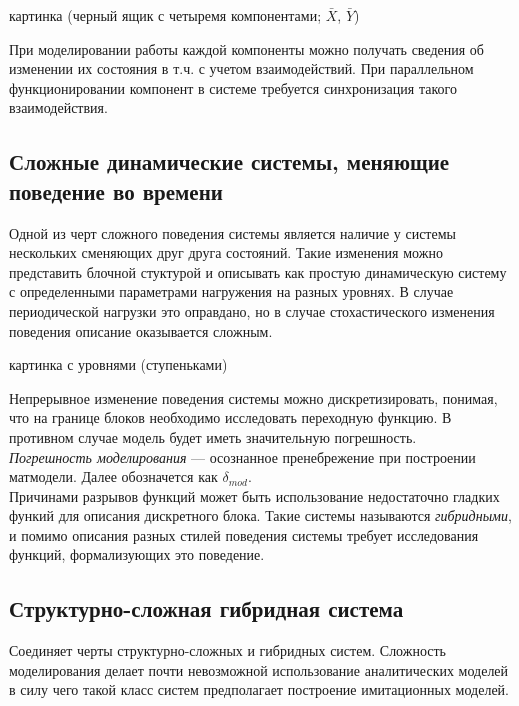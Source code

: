 \documentclass[12pt]{article}
\begin{document}
\begin{center}
    картинка (черный ящик с четыремя компонентами; $\bar{X}$, $\bar{Y}$)
\end{center}

При моделировании работы каждой компоненты можно получать сведения об изменении их состояния в т.ч. с учетом взаимодействий. При параллельном функционировании компонент в системе требуется синхронизация такого взаимодействия.

\subsection{Сложные динамические системы, меняющие поведение во времени}
Одной из черт сложного поведения системы является наличие у системы нескольких сменяющих друг друга состояний. Такие изменения можно представить блочной стуктурой и описывать как простую динамическую систему с определенными параметрами нагружения на разных уровнях. В случае периодической нагрузки это оправдано, но в случае стохастического изменения поведения описание оказывается сложным.

\begin{center}
    картинка с уровнями (ступеньками)
\end{center}

Непрерывное изменение поведения системы можно дискретизировать, понимая, что на границе блоков необходимо исследовать переходную функцию. В противном случае модель будет иметь значительную погрешность.\\

\emph{Погрешность моделирования} --- осознанное пренебрежение при построении матмодели. Далее обозначется как $\delta_{mod}$.\\

Причинами разрывов функций может быть использование недостаточно гладких функий для описания дискретного блока. Такие системы называются \emph{гибридными}, и помимо описания разных стилей поведения системы требует исследования функций, формализующих это поведение.

\subsection{Структурно-сложная гибридная система}
Соединяет черты структурно-сложных и гибридных систем. Сложность моделирования делает почти невозможной использование аналитических моделей в силу чего такой класс систем предполагает построение имитационных моделей.
\end{document}
